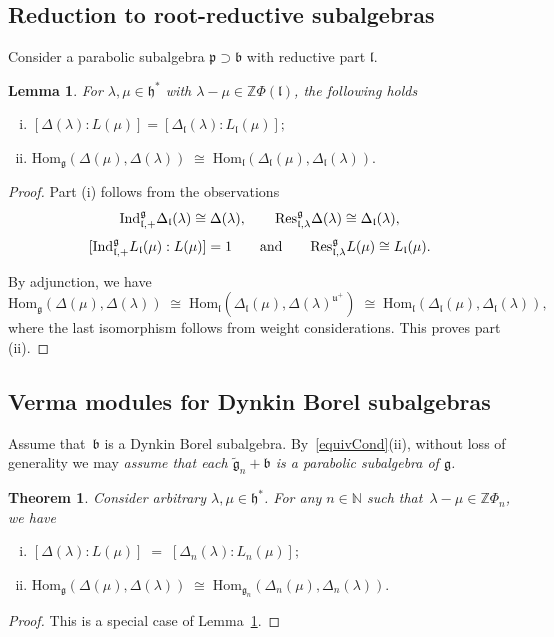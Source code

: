 \documentclass[11pt]{amsart}
\newcommand{\rR}{\Phi}
\newcommand{\Hom}{\mathrm{Hom}}
\newcommand{\fg}{\mathfrak{g}}
\newcommand{\fp}{\mathfrak{p}}
\newcommand{\fl}{\mathfrak{l}}
\newcommand{\fu}{\mathfrak{u}}
\newcommand{\fh}{\mathfrak{h}}
\newcommand{\fb}{\mathfrak{b}}
\newcommand{\mN}{\mathbb{N}}
\newcommand{\mZ}{\mathbb{Z}}
\numberwithin{equation}{section}
\theoremstyle{plain}
\newtheorem{lemma}[subsubsection]{Lemma}
\newtheorem{thm}[subsubsection]{Theorem}
\theoremstyle{remark}
\theoremstyle{remark}
\theoremstyle{construction}
\newcommand{\ind}{{\rm Ind}}
\newcommand{\res}{{\rm Res}}
\begin{document}
\subsection{Reduction to root-reductive subalgebras}
Consider a parabolic subalgebra $\fp\supset\fb$ with reductive part $\fl$.
\begin{lemma}\label{LemMult}
For $\lambda,\mu\in\fh^\ast$ with $\lambda-\mu\in\mZ\rR(\fl)$, {the following holds}
\begin{enumerate}[(i)]
\item $[\Delta(\lambda):L(\mu)]=[\Delta_{\fl}(\lambda):L_{\fl}(\mu)];$
\item $\Hom_{\fg}(\Delta(\mu),\Delta(\lambda))\;\cong\;\Hom_{\fl}(\Delta_{\fl}(\mu),\Delta_{\fl}(\lambda)).$
\end{enumerate}
\end{lemma}
\begin{proof}
Part (i) follows from the observations
$$\ind^{\fg}_{\fl,+}\Delta_{\fl}(\lambda)\cong\Delta(\lambda),\qquad \res^{\fg}_{\fl,\lambda}\Delta(\lambda)\cong\Delta_{\fl}(\lambda),$$
$$[\ind^{\fg}_{\fl,+}L_{\fl}(\mu):L(\mu)]=1\qquad\mbox{and}\qquad \res^{\fg}_{\fl,\lambda}L(\mu)\cong L_{\fl}(\mu).$$

By adjunction, we have
$$\Hom_{\fg}(\Delta(\mu),\Delta(\lambda))\;\cong\; \Hom_{\fl}(\Delta_{\fl}(\mu),\Delta(\lambda)^{\fu^+})\;\cong\; \Hom_{\fl}(\Delta_{\fl}(\mu),\Delta_{\fl}(\lambda)),$$
where the last isomorphism follows from weight considerations. This proves part (ii).
\end{proof}


\subsection{Verma modules for Dynkin Borel subalgebras}
Assume that~$\fb$ is a Dynkin Borel subalgebra. By~\ref{equivCond}(ii), without loss of generality we may {\em assume that each $\widetilde{\fg}_n+\fb$ is a parabolic subalgebra of $\fg$.}


\begin{thm}\label{ThmMult}
Consider arbitrary $\lambda,\mu\in\fh^\ast$. For any $n\in\mN$ such that~$\lambda-\mu \in\mZ\rR_n$, we have
\begin{enumerate}[(i)]
\item $[\Delta(\lambda):L(\mu)]\;=\;[\Delta_{n}(\lambda):L_{n}(\mu)];$
\item  $\Hom_{\fg}(\Delta(\mu),\Delta(\lambda))\;\cong\;\Hom_{\fg_n}(\Delta_n(\mu),\Delta_n(\lambda)).$
\end{enumerate}
\end{thm}
\begin{proof}
This is a special case of Lemma~\ref{LemMult}.
\end{proof}
\end{document}
